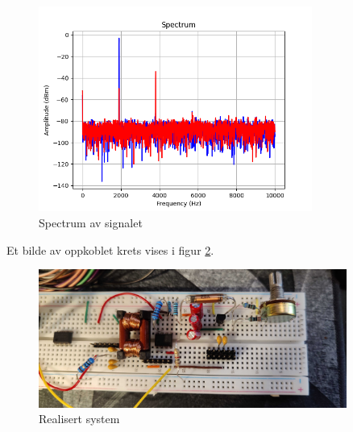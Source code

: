 \begin{figure}[!h]
\centering
\includegraphics[width=0.8\textwidth]{Bilder/Spectrum.png}
\caption{Spectrum av signalet}
\label{fig:spectrum}
\end{figure}

Et bilde av oppkoblet krets vises i figur \ref{fig:realisert_system}.

\begin{figure}[!h]
\centering
\includegraphics[angle=90,width=0.9\textwidth]{Bilder/Realisert_system.jpg}
\caption{Realisert system}
\label{fig:realisert_system}
\end{figure}